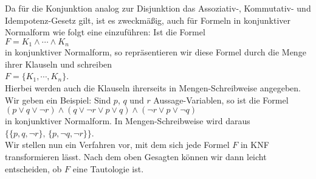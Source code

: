 Da für die Konjunktion analog zur Disjunktion das Assoziativ-, Kommutativ- und Idempotenz-Gesetz
gilt, ist es zweckmäßig, auch für Formeln in konjunktiver Normalform wie folgt eine
 einzuführen:  Ist die Formel
\\[0.2cm]
\hspace*{1.3cm}
$F = K_1 \wedge \cdots \wedge K_n$
\\[0.2cm]
in konjunktiver Normalform, so repräsentieren wir diese
Formel  durch die Menge ihrer Klauseln und schreiben \\[0.2cm]
\hspace*{1.3cm} 
$F = \{ K_1, \cdots, K_n \}$. 
\\[0.2cm]
Hierbei werden auch die Klauseln ihrerseits in Mengen-Schreibweise angegeben.
Wir geben ein Beispiel:  Sind $p$, $q$ und $r$ Aussage-Variablen, so ist die Formel
\\[0.2cm]
\hspace*{1.3cm}
$(p \vee q \vee \neg r) \wedge (q \vee \neg r \vee p \vee q)\wedge (\neg r \vee p \vee \neg q)$
\\[0.2cm]
in konjunktiver Normalform.  In Mengen-Schreibweise wird daraus
\\[0.2cm]
\hspace*{1.3cm}
$\bigl\{ \{p, q, \neg r \},\, \{ p, \neg q, \neg r \} \bigr\}$.
\\[0.2cm]
Wir stellen nun ein Verfahren vor, mit dem sich jede Formel $F$ in KNF transformieren lässt.  Nach
dem oben Gesagten können wir dann leicht entscheiden, ob $F$ eine Tautologie ist.
